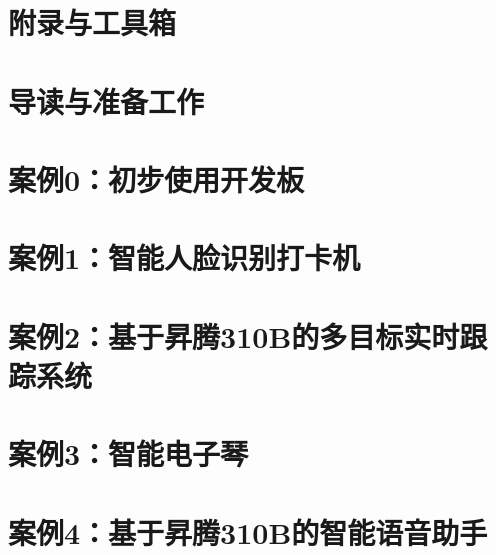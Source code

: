 \documentclass[fontsize=12pt, paper=a4, oneside, DIV=calc]{scrbook}
\theoremstyle{break}
\begin{document}
\chapter{附录与工具箱}


\chapter{导读与准备工作}


\chapter{案例0：初步使用开发板}


\chapter{案例1：智能人脸识别打卡机}


\chapter{案例2：基于昇腾310B的多目标实时跟踪系统}


\chapter{案例3：智能电子琴}


\chapter{案例4：基于昇腾310B的智能语音助手}





\end{document}
